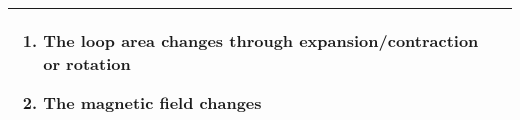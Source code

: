 \documentclass{article}
\begin{document}
\begin{center}
\begin{tabular}{|p{8cm}|p{8cm}|}
\begin{itemize}
			      \begin{enumerate}
				      \item The loop area changes through expansion/contraction or rotation
				      \item The magnetic field changes
			      \end{enumerate}

		\end{itemize}

		\\
		\hline
	\end{tabular}
\end{center}
\end{document}
